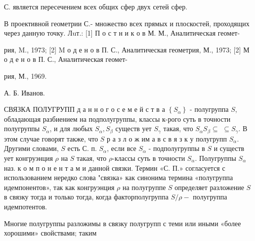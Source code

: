 \documentclass[10pt]{article}
\begin{document}
С. является пересечением всех общих сфер двух сетей сфер.



В проективной геометрии С.- множество всех прямых и плоскостей, проходящих через данную точку. Лuт.: [1] П о с т н и к о в М. М., Аналитическая геомет-

рия, M., 1973; [2] M о д е н о в П. С., Аналитическая геометрия, М., 1973; [2] М о д е н о в П. С., Аналитическая геомет-

рия, М., 1969.

А. Б. Иванов.



СВЯЗКА ПОЛУГРУПП д а н н о г о с е м е й с т в а $\left\{S_{\alpha}\right\}$ - полугруппа $S$, обладающая разбиением на подполугруппы, классы к-рого суть в точности полугруппы $S_{\alpha}$, и для любых $S_{\alpha}, S_{\beta}$ существ ует $S_{\gamma}$ такая, что $S_{\alpha} S_{\beta} \subseteq$ $\subseteq S_{\gamma}$. В этом случае говорят также, что $S$ р а з л о ж им а в с в я з к у полугрупп $S_{\alpha}$. Другими словами, $S$ есть С. п. $S_{\alpha}$, если все $S_{\alpha}$ - подполугруппы в $S$ и существ ует конгруэнция $\rho$ на $S$ такая, что $\rho$-классы суть в точности $S_{\alpha}$. Полугруппы $S_{\alpha}$ наз. к о м п о н е н т а м и данной связки. Термин «С. П.» согласуется с использованием нередко слова "связка» как синонима термина «полугруппа идемпонентов», так как конгруэнция $\rho$ на полугруппе $S$ определяет разложение $S$ в связку тогда и только тогда, когда факторполугруппа $S / \rho-$ полугруппа идемпотентов.



Многие полугруппы разложимы в связку полугрупп с теми или иными «более хорошими» свойствами; таким
\end{document}
